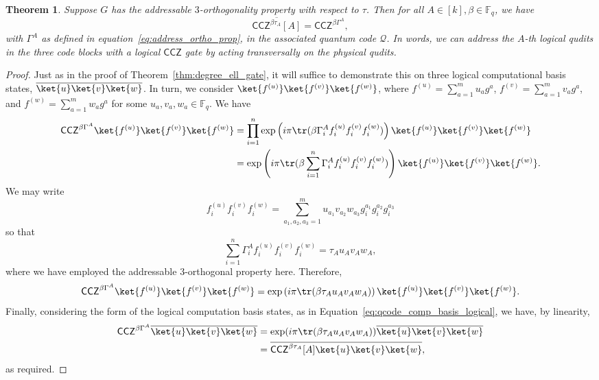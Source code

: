 \documentclass[11pt]{article}
\newtheorem{theorem}{Theorem}[section]
\theoremstyle{definition}
\newcommand{\CCZ}{\mathsf{CCZ}}
\newcommand{\qcode}{\mathcal{Q}}
\newcommand{\FF}{\mathbb{F}}
\newcommand*{\ol}{\overline}
\begin{document}
\begin{theorem}\label{thm:single_index_CCZ}
    Suppose $G$ has the addressable $3$-orthogonality property with respect to $\tau$. Then for all $A\in [k], \beta\in \FF_q$, we have
    \begin{equation}
        \ol{\CCZ^{\beta\tau_A}[A]} = \CCZ^{\beta\Gamma^A},
    \end{equation}
    with $\Gamma^A$ as defined in equation~\eqref{eq:address_ortho_prop}, in the associated quantum code $\qcode$. In words, we can address the $A$-th logical qudits in the three code blocks with a logical $\CCZ$ gate by acting transversally on the physical qudits.
\end{theorem}
\begin{proof}
    Just as in the proof of Theorem~\ref{thm:degree_ell_gate}, it will suffice to demonstrate this on three logical computational basis states, $\ol{\ket{u}\ket{v}\ket{w}}$. In turn, we consider $\ket{f^{(u)}}\ket{f^{(v)}}\ket{f^{(w)}}$, where $f^{(u)} = \sum_{a=1}^mu_ag^a$, $f^{(v)} = \sum_{a=1}^mv_ag^a$, and $f^{(w)} = \sum_{a=1}^mw_ag^a$ for some $u_a, v_a, w_a \in \mathbb{F}_q$. We have
    \begin{align}
        \CCZ^{\beta\Gamma^A}\ket{f^{(u)}}\ket{f^{(v)}}\ket{f^{(w)}} &= \prod_{i=1}^n\exp\left(i\pi\tr(\beta\Gamma_i^Af^{(u)}_if^{(v)}_if^{(w)}_i)\right)\ket{f^{(u)}}\ket{f^{(v)}}\ket{f^{(w)}}\\
        &=\exp\left(i\pi\tr(\beta\sum_{i=1}^n\Gamma_i^Af_i^{(u)}f_i^{(v)}f_i^{(w)})\right)\ket{f^{(u)}}\ket{f^{(v)}}\ket{f^{(w)}}.
    \end{align}
    We may write
    \begin{equation}
        f_i^{(u)}f_i^{(v)}f_i^{(w)} = \sum_{a_1, a_2, a_3=1}^mu_{a_1}v_{a_2}w_{a_3}g_i^{a_1}g_i^{a_2}g_i^{a_3}
    \end{equation}
    so that
    \begin{equation}
        \sum_{i=1}^n\Gamma_i^Af_i^{(u)}f_i^{(v)}f_i^{(w)} = \tau_Au_Av_Aw_A,
    \end{equation}
    where we have employed the addressable 3-orthogonal property here. Therefore,
    \begin{equation}
        \CCZ^{\beta\Gamma^A}\ket{f^{(u)}}\ket{f^{(v)}}\ket{f^{(w)}} = \exp\left(i\pi\tr(\beta\tau_Au_Av_Aw_A)\right)\ket{f^{(u)}}\ket{f^{(v)}}\ket{f^{(w)}}.
    \end{equation}
    Finally, considering the form of the logical computation basis states, as in Equation~\eqref{eq:qcode_comp_basis_logical}, we have, by linearity,
    \begin{align}
        \CCZ^{\beta \Gamma^A}\ol{\ket{u}\ket{v}\ket{w}} &= \exp(i\pi\tr(\beta\tau_Au_Av_Aw_A))\ol{\ket{u}\ket{v}\ket{w}}\\
        &=\ol{\CCZ^{\beta\tau_A}[A]\ket{u}\ket{v}\ket{w}},
    \end{align}
    as required.
\end{proof}
\end{document}
